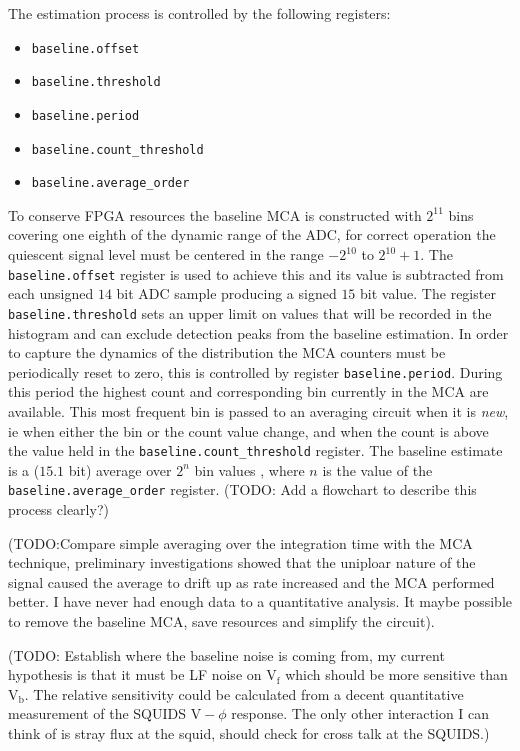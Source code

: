 \documentclass{article}
\newcommand{\code}[1]{\texttt{#1}}
\begin{document}
The estimation process is controlled by the following registers:
\begin{itemize}
  \item \code{baseline.offset}
  \item \code{baseline.threshold}
  \item \code{baseline.period}
  \item \code{baseline.count\_threshold}
  \item \code{baseline.average\_order}
\end{itemize} 

To conserve FPGA resources the baseline MCA is constructed with $2^{11}$ bins
covering one eighth of the dynamic range of the ADC, for correct operation the
quiescent signal level must be centered in the range $-2^{10}$ to $2^{10}+1$. 
The \code{baseline.offset} register is used to achieve this and its value is
subtracted from each unsigned $14$ bit ADC sample producing a signed $15$ bit
value. The register \code{baseline.threshold} sets an upper limit on values that
will be recorded in the histogram and can exclude detection peaks from the
baseline estimation.
In order to capture the dynamics of the distribution the MCA counters must be
periodically reset to zero, this is controlled by register
\code{baseline.period}. During this period the 
highest count and corresponding bin currently in the MCA are available. This
most frequent bin is passed to an averaging circuit when it is \emph{new}, ie
when either the bin or the count value change, and when the count is above 
the value held in the \code{baseline.count\_threshold} register. The baseline
estimate is a ($15.1$ bit) average over $2^{n}$ bin values , where $n$ is the
value of the \code{baseline.average\_order} register. (TODO: Add a flowchart to
describe this process clearly?)

(TODO:Compare simple averaging over the integration time with the MCA
technique, preliminary investigations showed that the uniploar nature of the
signal caused the average to drift up as rate increased and the MCA performed
better. I have never had enough data to a quantitative
analysis. It maybe possible to remove the
baseline MCA, save resources and simplify the circuit).

(TODO: Establish where the baseline noise is coming from, my current hypothesis
is that it must be LF noise on $\mathrm{V}_\mathrm{f}$ which should be more
sensitive than $\mathrm{V}_\mathrm{b}$. The relative sensitivity could be
calculated from a decent quantitative measurement of the SQUIDS
$\mathrm{V}-\phi$ response. The only other interaction I can think of is
stray flux at the squid, should check for cross talk at the SQUIDS.)
\end{document}
